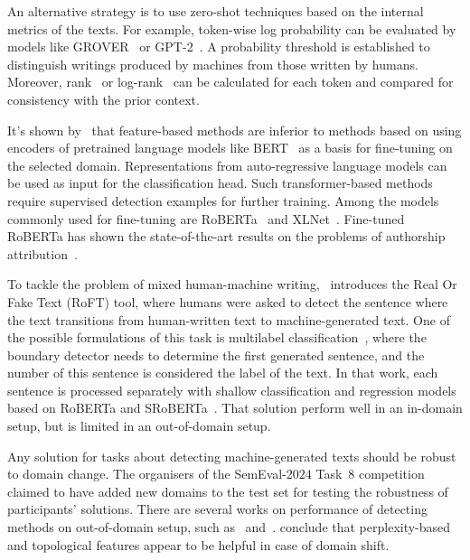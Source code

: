 \documentclass[11pt]{article}
\begin{document}
An alternative strategy is to use zero-shot techniques based on the internal metrics of the texts. For example, token-wise log probability can be evaluated by models like GROVER~\cite{zellers2020defending} or GPT-2~\cite{solaiman2019release}. A probability threshold is established to distinguish writings produced by machines from those written by humans. Moreover, rank~\cite{gltr} or log-rank~\cite{mitchell2023detectgpt} can be calculated for each token and compared for consistency with the prior context.

It's shown by~\citet{ippolito-etal-2020-automatic} that feature-based methods are inferior to methods based on using encoders of pretrained language models like BERT~\cite{devlin-etal-2019-bert} as a basis for fine-tuning on the selected domain. Representations from auto-regressive language models can be used as input for the classification head. Such transformer-based methods require supervised detection examples for further training. Among the models commonly used for fine-tuning are RoBERTa~\cite{roberta} and XLNet~\cite{xlnet}.
Fine-tuned RoBERTa has shown the state-of-the-art results on the problems of authorship attribution~\cite{uchendu2021turingbench}.

To tackle the problem of mixed human-machine writing,~\citet{dugan2022real} introduces the Real Or Fake Text (RoFT) tool, where humans were asked to detect the sentence where the text transitions from human-written text to machine-generated text. One of the possible formulations of this task is multilabel classification~\cite{Cutler2021AutomaticDO}, where the boundary detector needs to determine the first generated sentence, and the number of this sentence is considered the label of the text. In that work, each sentence is processed separately with shallow classification and regression models based on RoBERTa and SRoBERTa~\cite{reimers2019sentencebert}. That solution perform well in an in-domain setup, but is limited in an out-of-domain setup. 

Any solution for tasks about detecting machine-generated texts should be robust to domain change. 
The organisers of the SemEval-2024 Task~8 competition claimed to have added new domains to the test set for testing the robustness of participants' solutions. There are several works on performance of detecting methods on out-of-domain setup, such as~\citet{kushnareva2023artificial} and~\citet{zeng2023automatic}. \citet{kushnareva2023artificial} conclude that perplexity-based and topological features appear to be helpful in case of domain shift.
 
\end{document}
